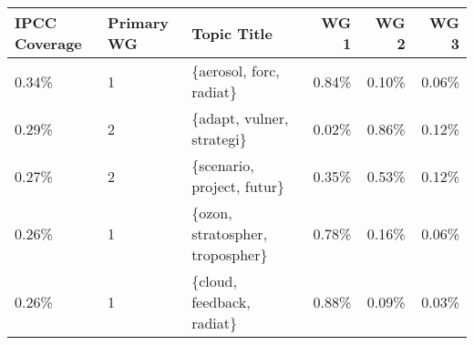 \begin{tabular}{p{1.4cm} p{1cm} l r r r}
\toprule
 IPCC Coverage &  Primary WG &                      Topic Title &  WG 1 &  WG 2 &  WG 3 \\
\midrule
         0.34\% &           1 &          \{aerosol, forc, radiat\} & 0.84\% & 0.10\% & 0.06\% \\
         0.29\% &           2 &        \{adapt, vulner, strategi\} & 0.02\% & 0.86\% & 0.12\% \\
         0.27\% &           2 &       \{scenario, project, futur\} & 0.35\% & 0.53\% & 0.12\% \\
         0.26\% &           1 &  \{ozon, stratospher, tropospher\} & 0.78\% & 0.16\% & 0.06\% \\
         0.26\% &           1 &        \{cloud, feedback, radiat\} & 0.88\% & 0.09\% & 0.03\% \\
\bottomrule
\end{tabular}

